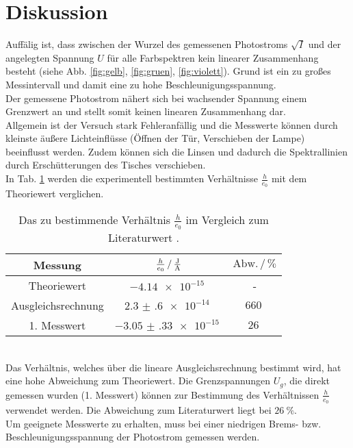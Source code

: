 \section{Diskussion}
\label{sec:Diskussion}
Auffälig ist, dass zwischen der Wurzel des gemessenen Photostroms $\sqrt{I}$ und der angelegten Spannung $U$ für alle Farbspektren kein linearer Zusammenhang besteht (siehe Abb. \ref{fig:gelb}, \ref{fig:gruen}, \ref{fig:violett}).
Grund ist ein zu großes Messintervall und damit eine zu hohe Beschleunigungsspannung.
\\
Der gemessene Photostrom nähert sich bei wachsender Spannung einem Grenzwert an und stellt somit keinen linearen Zusammenhang dar.
\\
Allgemein ist der Versuch stark Fehleranfällig und die Messwerte können durch kleinste äußere Lichteinflüsse (Öffnen der Tür, Verschieben der Lampe) beeinflusst werden.
Zudem können sich die Linsen und dadurch die Spektrallinien durch Erschütterungen des Tisches verschieben.
\\
In Tab. \ref{tab:vergleich} werden die experimentell bestimmten Verhältnisse $\frac{h}{e_0}$ mit dem Theoriewert \cite{konstanten} verglichen.
\begin{table}
    \centering
    \begin{tabular}{c|cc}
    \toprule
    Messung & $\frac{h}{e_0} \,/\, \si{\frac{\joule}{\ampere}}$ & $\text{Abw.} \,/\, \si{\percent}$ \\
    \midrule
    Theoriewert & $\SI{-4.14e-15}{}$ & - \\
    Ausgleichsrechnung & $\SI{2.3(6)e-14}{}$ & $\SI{660}{}$ \\
    1. Messwert & $\SI{-3.05(33)e-15}{}$ & $\SI{26}{}$ \\
    \bottomrule
    \end{tabular}
    \caption{Das zu bestimmende Verhältnis $\frac{h}{e_0}$ im Vergleich zum Literaturwert \cite{konstanten}.}
    \label{tab:vergleich}
\end{table}
\\
Das Verhältnis, welches über die lineare Ausgleichsrechnung bestimmt wird, hat eine hohe Abweichung zum Theoriewert.
Die Grenzspannungen $U_g$, die direkt gemessen wurden (1. Messwert) können zur Bestimmung des Verhältnissen $\frac{h}{e_0}$ verwendet werden.
Die Abweichung zum Literaturwert liegt bei $\SI{26}{\percent}$.
\\
Um geeignete Messwerte zu erhalten, muss bei einer niedrigen Brems- bzw. Beschleunigungsspannung der Photostrom gemessen werden.